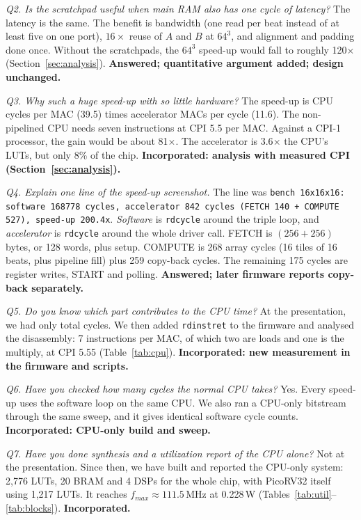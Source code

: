 \documentclass[10pt,twocolumn,a4paper]{article}
\begin{document}
\emph{Q2. Is the scratchpad useful when main RAM also has one cycle of
latency?} The latency is the same. The benefit is bandwidth (one read per beat
instead of at least five on one port), $16\times$ reuse of $A$ and $B$ at
$64^3$, and alignment and padding done once. Without the scratchpads, the
$64^3$ speed-up would fall to roughly 120$\times$
(Section~\ref{sec:analysis}). \textbf{Answered; quantitative argument added;
design unchanged.}

\emph{Q3. Why such a huge speed-up with so little hardware?} The speed-up is
CPU cycles per MAC (39.5) times accelerator MACs per cycle (11.6). The
non-pipelined CPU needs seven instructions at CPI 5.5 per MAC. Against a CPI-1
processor, the gain would be about 81$\times$. The accelerator is 3.6$\times$
the CPU's LUTs, but only 8\% of the chip. \textbf{Incorporated: analysis with
measured CPI (Section~\ref{sec:analysis}).}

\emph{Q4. Explain one line of the speed-up screenshot.} The line was
\texttt{bench 16x16x16: software 168778 cycles, accelerator 842 cycles (FETCH
140 + COMPUTE 527), speed-up 200.4x}. \emph{Software} is \texttt{rdcycle}
around the triple loop, and \emph{accelerator} is \texttt{rdcycle} around the
whole driver call. FETCH is $(256+256)$ bytes, or 128 words, plus setup.
COMPUTE is 268 array cycles (16 tiles of 16 beats, plus pipeline fill) plus
259 copy-back cycles. The remaining 175 cycles are register writes, START and
polling. \textbf{Answered; later firmware reports copy-back separately.}

\emph{Q5. Do you know which part contributes to the CPU time?} At the
presentation, we had only total cycles. We then added \texttt{rdinstret} to
the firmware and analysed the disassembly: 7 instructions per MAC, of which two
are loads and one is the multiply, at CPI 5.55 (Table~\ref{tab:cpu}).
\textbf{Incorporated: new measurement in the firmware and scripts.}

\emph{Q6. Have you checked how many cycles the normal CPU takes?} Yes. Every
speed-up uses the software loop on the same CPU. We also ran a CPU-only
bitstream through the same sweep, and it gives identical software cycle
counts. \textbf{Incorporated: CPU-only build and sweep.}

\emph{Q7. Have you done synthesis and a utilization report of the CPU
alone?} Not at the presentation. Since then, we have built and reported the
CPU-only system: 2,776 LUTs, 20 BRAM and 4 DSPs for the whole chip, with
PicoRV32 itself using 1,217 LUTs. It reaches $f_{max}\approx111.5$\,MHz at
0.228\,W (Tables~\ref{tab:util}--\ref{tab:blocks}). \textbf{Incorporated.}
\end{document}

